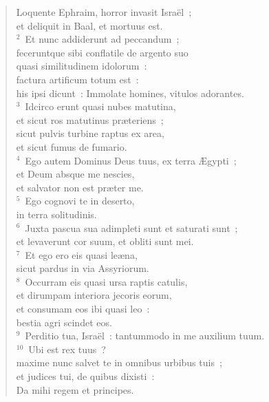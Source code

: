 \begin{flushleft}\begin{verse}\vspace{-19pt}\hspace{6pt}Loquente Ephraim, horror invasit Isra\"el~;\\\hspace{6pt} et deliquit in Baal, et mortuus est.\\
${}^{2}$~Et nunc addiderunt ad peccandum~;\\ feceruntque sibi conflatile de argento suo\\ quasi similitudinem idolorum~:\\ factura artificum totum est~:\\ his ipsi dicunt~: Immolate homines, vitulos adorantes.\\
${}^{3}$~Idcirco erunt quasi nubes matutina,\\ et sicut ros matutinus pr\ae teriens~;\\ sicut pulvis turbine raptus ex area,\\ et sicut fumus de fumario.\\
${}^{4}$~Ego autem Dominus Deus tuus, ex terra \AE gypti~;\\ et Deum absque me nescies,\\ et salvator non est pr\ae ter me.\\
${}^{5}$~Ego cognovi te in deserto,\\ in terra solitudinis.\\
${}^{6}$~Juxta pascua sua adimpleti sunt et saturati sunt~;\\ et levaverunt cor suum, et obliti sunt mei.\\
${}^{7}$~Et ego ero eis quasi le\ae na,\\ sicut pardus in via Assyriorum.\\
${}^{8}$~Occurram eis quasi ursa raptis catulis,\\ et dirumpam interiora jecoris eorum,\\ et consumam eos ibi quasi leo~:\\ bestia agri scindet eos.\\
${}^{9}$~Perditio tua, Isra\"el~: tantummodo in me auxilium tuum.\\
${}^{10}$~Ubi est rex tuus~?\\ maxime nunc salvet te in omnibus urbibus tuis~;\\ et judices tui, de quibus dixisti~:\\ Da mihi regem et principes.\\

\end{verse}
\end{flushleft}
